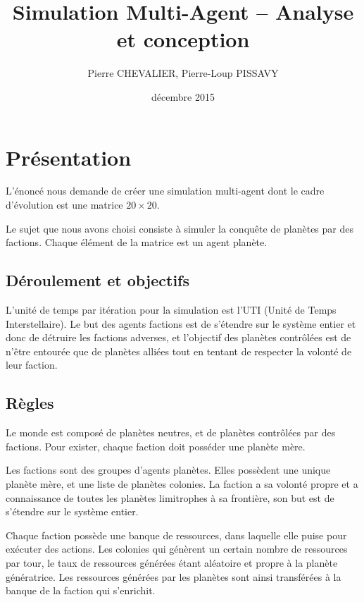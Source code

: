 \documentclass{article}
\title{Simulation Multi-Agent -- Analyse et conception}
\author{Pierre CHEVALIER, Pierre-Loup PISSAVY}
\date{décembre 2015}
\begin{document}
  \maketitle
  \setlength{\parskip}{10pt}

  \section{Présentation}

    L'énoncé nous demande de créer une simulation multi-agent dont le cadre d'évolution est une matrice $20 \times 20$.

    Le sujet que nous avons choisi consiste à simuler la conquête de planètes par des factions. Chaque élément de la matrice est un agent planète.

    \subsection{Déroulement et objectifs}

    L'unité de temps par itération pour la simulation est l'UTI (Unité de Temps Interstellaire). Le but des agents factions est de s'étendre sur le système entier et donc de détruire les factions adverses, et l'objectif des planètes contrôlées est de n'être entourée que de planètes alliées tout en tentant de respecter la volonté de leur faction.

    \subsection{Règles}
	
    Le monde est composé de planètes neutres, et de planètes contrôlées par des factions. Pour exister, chaque faction doit posséder une planète mère.
	
    Les factions sont des groupes d'agents planètes. Elles possèdent une unique planète mère, et une liste de planètes colonies. La faction a sa volonté propre et a connaissance de toutes les planètes limitrophes à sa frontière, son but est de s'étendre sur le système entier.

    Chaque faction possède une banque de ressources, dans laquelle elle puise pour exécuter des actions. Les colonies qui génèrent un certain nombre de ressources par tour, le taux de ressources générées étant aléatoire et propre à la planète génératrice. Les ressources générées par les planètes sont ainsi transférées à la banque de la faction qui s'enrichit.
	
\end{document}
